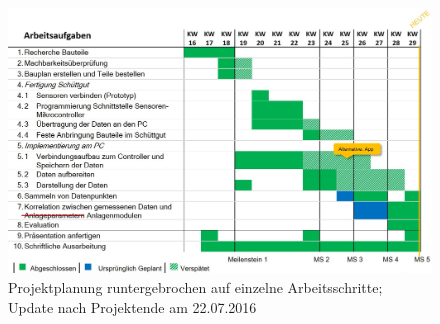 \begin{figure}[ht]
	\centering
	\includegraphics[width=1\textwidth]{images/k2-projektplan.JPG}
	\caption {Projektplanung runtergebrochen auf einzelne Arbeitsschritte; Update nach Projektende am 22.07.2016}
	\label{fig:k2}
\end{figure}